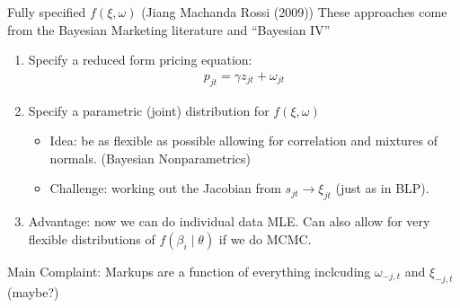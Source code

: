 \begin{frame}{Fully specified $f(\xi,\omega)$ (Jiang Machanda Rossi (2009))}
These approaches come from the Bayesian Marketing literature and ``Bayesian IV''
\begin{enumerate}
    \item Specify a reduced form pricing equation:
    \begin{align*}
        p_{jt} = \gamma z_{jt}  + \omega_{jt}
    \end{align*}
    \item Specify a parametric (joint) distribution for $f(\xi, \omega)$
    \begin{itemize}
        \item Idea: be as flexible as possible allowing for correlation and mixtures of normals. (Bayesian Nonparametrics)
        \item Challenge: working out the Jacobian from $s_{jt} \rightarrow \xi_{jt}$ (just as in BLP).
    \end{itemize}
    \item Advantage: now we can do individual data MLE. Can also allow for very flexible distributions of $f(\beta_i \mid \theta)$ if we do MCMC.
\end{enumerate}
Main Complaint: Markups are a function of \alert{everything} inclcuding $\omega_{-j,t}$ and $\xi_{-j,t}$ (maybe?)
\end{frame}

